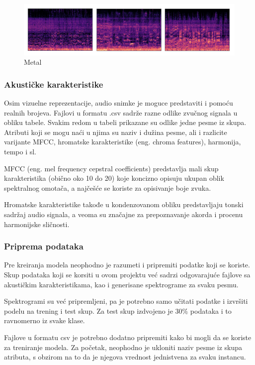 \documentclass{article}
\begin{document}
\begin{figure}[h]
\centering
\includegraphics[scale=0.65]{metal}
\caption{Metal}
\end{figure}


\subsubsection{Akustičke karakteristike}

Osim vizuelne reprezentacije, audio snimke je moguce predstaviti i pomoću realnih brojeva. Fajlovi u formatu .csv sadrže razne odlike zvučnog signala u obliku tabele. Svakim redom u tabeli prikazane su odlike jedne pesme iz skupa. Atributi koji se mogu naći u njima su naziv i dužina pesme, ali i razlicite varijante MFCC, hromatske karakteristike (eng. chroma features), harmonija, tempo i sl. 

MFCC (eng. mel frequency cepstral coefficients) predstavlja mali skup karakteristika (obično oko 10 do 20) koje koncizno opisuju ukupan oblik spektralnog omotača, a najčešće se koriste za opisivanje boje zvuka.

Hromatske karakteristike takođe u kondenzovanom obliku predstavljaju tonski sadržaj audio signala, a veoma su značajne za prepoznavanje akorda i procenu harmonijske sličnosti.


\subsubsection{Priprema podataka}

Pre kreiranja modela neophodno je razumeti i pripremiti podatke koji se koriste. Skup podataka koji se korsiti u ovom projektu već sadrzi odgovarajuće fajlove sa akustičkim karakteristikama, kao i generisane spektrograme za svaku pesmu.

Spektrogrami su već pripremljeni, pa je potrebno samo učitati podatke i izvršiti podelu na trening i test skup. Za test skup izdvojeno je 30\% podataka i to ravnomerno iz svake klase.

Fajlove u formatu csv je potrebno dodatno pripremiti kako bi mogli da se koriste za treniranje modela. Za početak, neophodno je ukloniti naziv pesme iz skupa atributa, s obzirom na to da je njegova vrednost jednistvena za svaku instancu.
\end{document}

